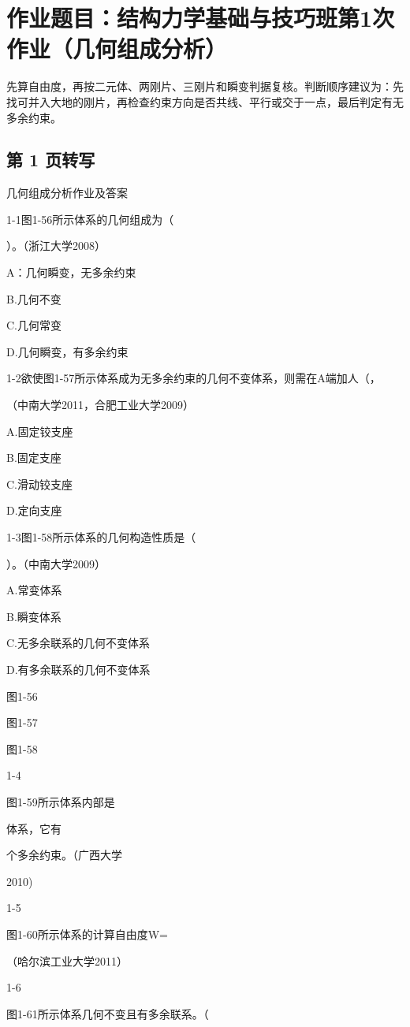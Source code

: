 \section{作业题目：结构力学基础与技巧班第1次作业（几何组成分析）}
\begin{analysisbox}
先算自由度，再按二元体、两刚片、三刚片和瞬变判据复核。判断顺序建议为：先找可并入大地的刚片，再检查约束方向是否共线、平行或交于一点，最后判定有无多余约束。
\end{analysisbox}
\subsection*{第 1 页转写}
几何组成分析作业及答案

1-1图1-56所示体系的几何组成为（

）。（浙江大学2008）

A：几何瞬变，无多余约束

B.几何不变

C.几何常变

D.几何瞬变，有多余约束

1-2欲使图1-57所示体系成为无多余约束的几何不变体系，则需在A端加人（，

（中南大学2011，合肥工业大学2009）

A.固定铰支座

B.固定支座

C.滑动铰支座

D.定向支座

1-3图1-58所示体系的几何构造性质是（

）。（中南大学2009）

A.常变体系

B.瞬变体系

C.无多余联系的几何不变体系

D.有多余联系的几何不变体系

图1-56

图1-57

图1-58

1-4

图1-59所示体系内部是

体系，它有

个多余约束。（广西大学

2010)

1-5

图1-60所示体系的计算自由度W=

（哈尔滨工业大学2011）

1-6

图1-61所示体系几何不变且有多余联系。（

